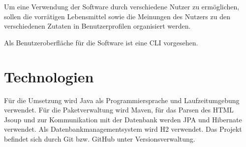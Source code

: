 Um eine Verwendung der Software durch verschiedene Nutzer zu ermöglichen, sollen die vorrätigen Lebensmittel sowie die Meinungen des Nutzers zu den verschiedenen Zutaten in Benutzerprofilen organisiert werden.

Als Benutzeroberfläche für die Software ist eine \ac{CLI} vorgesehen.

\section{Technologien}
Für die Umsetzung wird Java als Programmiersprache und Laufzeitumgebung verwendet. Für die Paketverwaltung wird Maven, für das Parsen des HTML Jsoup und zur Kommunikation mit der Datenbank werden JPA und Hibernate verwendet. Als Datenbankmanagementsystem wird H2 verwendet. Das Projekt befindet sich durch Git bzw. GitHub unter Versionsverwaltung.
